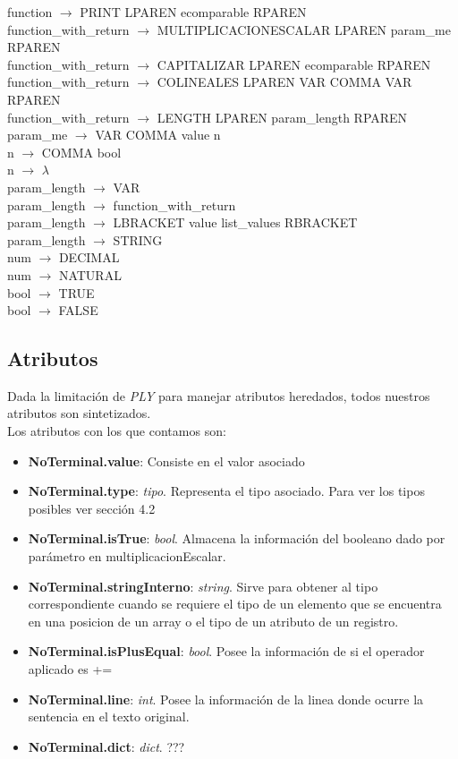 \documentclass[10pt,a4paper]{article}
\begin{document}
function $\rightarrow$ PRINT LPAREN ecomparable RPAREN \\
function\_with\_return $\rightarrow$ MULTIPLICACIONESCALAR LPAREN param\_me RPAREN \\
function\_with\_return $\rightarrow$ CAPITALIZAR LPAREN ecomparable RPAREN \\
function\_with\_return $\rightarrow$ COLINEALES LPAREN VAR COMMA VAR RPAREN \\
function\_with\_return $\rightarrow$ LENGTH LPAREN param\_length RPAREN \\
param\_me $\rightarrow$ VAR COMMA value n \\
n $\rightarrow$ COMMA bool \\
n $\rightarrow$ $\lambda$ \\
param\_length $\rightarrow$ VAR \\
param\_length $\rightarrow$ function\_with\_return \\
param\_length $\rightarrow$ LBRACKET value list\_values RBRACKET \\
param\_length $\rightarrow$ STRING \\
num $\rightarrow$ DECIMAL \\
num $\rightarrow$ NATURAL \\
bool $\rightarrow$ TRUE \\
bool $\rightarrow$ FALSE \\

\newpage
\subsection{Atributos}

Dada la limitación de \textit{PLY} para manejar atributos heredados, todos nuestros atributos son sintetizados.\\

Los atributos con los que contamos son:
\begin{itemize}
\item \textbf{NoTerminal.value}: Consiste en el valor asociado
\item \textbf{NoTerminal.type}: \textit{tipo}. Representa el tipo asociado. Para ver los tipos posibles ver sección 4.2
\item \textbf{NoTerminal.isTrue}: \textit{bool}. Almacena la información del booleano dado por parámetro en multiplicacionEscalar.
\item \textbf{NoTerminal.stringInterno}: \textit{string}. Sirve para obtener al tipo correspondiente cuando se requiere el tipo de un elemento que se encuentra en una posicion de un array o el tipo de un atributo de un registro.
\item \textbf{NoTerminal.isPlusEqual}: \textit{bool}. Posee la información de si el operador aplicado es +=
\item \textbf{NoTerminal.line}: \textit{int}. Posee la información de la linea donde ocurre la sentencia en el texto original.
\item \textbf{NoTerminal.dict}: \textit{dict}. ???
\end{itemize}
\end{document}
